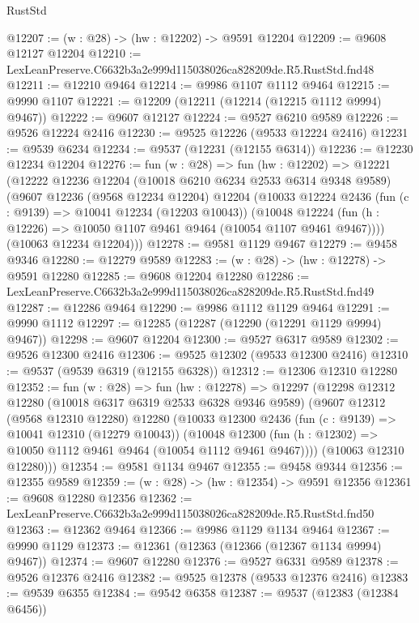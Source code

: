 \begin{lexlean}{RustStd}
\begin{coremodule}
@12207 := (w : @28) -> (hw : @12202) -> @9591 @12204
@12209 := @9608 @12127 @12204
@12210 := LexLeanPreserve.C6632b3a2e999d115038026ca828209de.R5.RustStd.fnd48
@12211 := @12210 @9464
@12214 := @9986 @1107 @1112 @9464
@12215 := @9990 @1107
@12221 := @12209 (@12211 (@12214 (@12215 @1112 @9994) @9467))
@12222 := @9607 @12127
@12224 := @9527 @6210 @9589
@12226 := @9526 @12224 @2416
@12230 := @9525 @12226 (@9533 @12224 @2416)
@12231 := @9539 @6234
@12234 := @9537 (@12231 (@12155 @6314))
@12236 := @12230 @12234 @12204
@12276 := fun (w : @28) =>
  fun (hw : @12202) =>
  @12221
    (@12222
      @12236
      @12204
      (@10018 @6210 @6234 @2533 @6314 @9348 @9589)
      (@9607
        @12236
        (@9568 @12234 @12204)
        @12204
        (@10033
          @12224
          @2436
          (fun (c : @9139) => @10041 @12234 (@12203 @10043))
          (@10048 @12224 (fun (h : @12226) => @10050 @1107 @9461 @9464 (@10054 @1107 @9461 @9467))))
        (@10063 @12234 @12204)))
@12278 := @9581 @1129 @9467
@12279 := @9458 @9346
@12280 := @12279 @9589
@12283 := (w : @28) -> (hw : @12278) -> @9591 @12280
@12285 := @9608 @12204 @12280
@12286 := LexLeanPreserve.C6632b3a2e999d115038026ca828209de.R5.RustStd.fnd49
@12287 := @12286 @9464
@12290 := @9986 @1112 @1129 @9464
@12291 := @9990 @1112
@12297 := @12285 (@12287 (@12290 (@12291 @1129 @9994) @9467))
@12298 := @9607 @12204
@12300 := @9527 @6317 @9589
@12302 := @9526 @12300 @2416
@12306 := @9525 @12302 (@9533 @12300 @2416)
@12310 := @9537 (@9539 @6319 (@12155 @6328))
@12312 := @12306 @12310 @12280
@12352 := fun (w : @28) =>
  fun (hw : @12278) =>
  @12297
    (@12298
      @12312
      @12280
      (@10018 @6317 @6319 @2533 @6328 @9346 @9589)
      (@9607
        @12312
        (@9568 @12310 @12280)
        @12280
        (@10033
          @12300
          @2436
          (fun (c : @9139) => @10041 @12310 (@12279 @10043))
          (@10048 @12300 (fun (h : @12302) => @10050 @1112 @9461 @9464 (@10054 @1112 @9461 @9467))))
        (@10063 @12310 @12280)))
@12354 := @9581 @1134 @9467
@12355 := @9458 @9344
@12356 := @12355 @9589
@12359 := (w : @28) -> (hw : @12354) -> @9591 @12356
@12361 := @9608 @12280 @12356
@12362 := LexLeanPreserve.C6632b3a2e999d115038026ca828209de.R5.RustStd.fnd50
@12363 := @12362 @9464
@12366 := @9986 @1129 @1134 @9464
@12367 := @9990 @1129
@12373 := @12361 (@12363 (@12366 (@12367 @1134 @9994) @9467))
@12374 := @9607 @12280
@12376 := @9527 @6331 @9589
@12378 := @9526 @12376 @2416
@12382 := @9525 @12378 (@9533 @12376 @2416)
@12383 := @9539 @6355
@12384 := @9542 @6358
@12387 := @9537 (@12383 (@12384 @6456))

\end{coremodule}
\end{lexlean}
